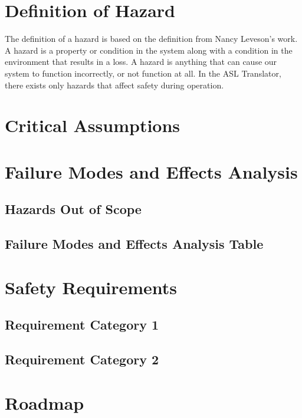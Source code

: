 \documentclass{article}
\begin{document}
\section{Definition of Hazard}

The definition of a hazard is based on the definition from Nancy Leveson’s work. A hazard is a property or condition in the system along with a condition in the
environment that results in a loss. A hazard is anything that can cause our system to function incorrectly, or not function at all. In the ASL Translator, there
exists only hazards that affect safety during operation.\\


\section{Critical Assumptions}

\section{Failure Modes and Effects Analysis}

\subsection{Hazards Out of Scope}

\subsection{Failure Modes and Effects Analysis Table}

\section{Safety Requirements}
\subsection{Requirement Category 1}
\subsection{Requirement Category 2}

\section{Roadmap}
\end{document}
